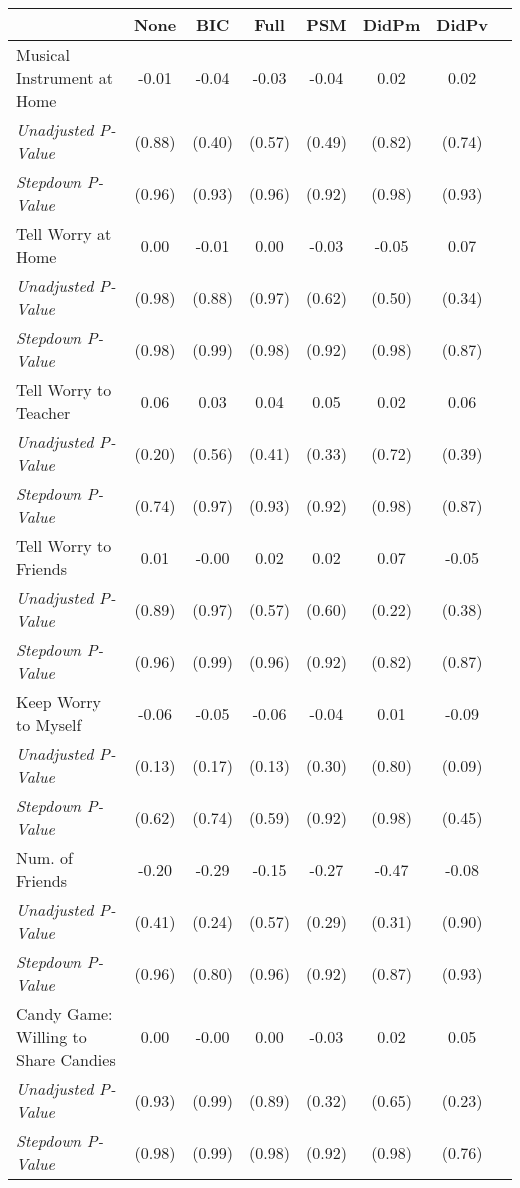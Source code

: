 \begin{tabular}{l c c c c c c c}
\toprule
 & None & BIC & Full & PSM & DidPm & DidPv \\
\midrule
Musical Instrument at Home & -0.01 & -0.04 & -0.03 & -0.04 & 0.02 & 0.02 \\
\quad \textit{Unadjusted P-Value} & (0.88) & (0.40) & (0.57) & (0.49) & (0.82) & (0.74) \\
\quad \textit{Stepdown P-Value} & (0.96) & (0.93) & (0.96) & (0.92) & (0.98) & (0.93) \\
Tell Worry at Home & 0.00 & -0.01 & 0.00 & -0.03 & -0.05 & 0.07 \\
\quad \textit{Unadjusted P-Value} & (0.98) & (0.88) & (0.97) & (0.62) & (0.50) & (0.34) \\
\quad \textit{Stepdown P-Value} & (0.98) & (0.99) & (0.98) & (0.92) & (0.98) & (0.87) \\
Tell Worry to Teacher & 0.06 & 0.03 & 0.04 & 0.05 & 0.02 & 0.06 \\
\quad \textit{Unadjusted P-Value} & (0.20) & (0.56) & (0.41) & (0.33) & (0.72) & (0.39) \\
\quad \textit{Stepdown P-Value} & (0.74) & (0.97) & (0.93) & (0.92) & (0.98) & (0.87) \\
Tell Worry to Friends & 0.01 & -0.00 & 0.02 & 0.02 & 0.07 & -0.05 \\
\quad \textit{Unadjusted P-Value} & (0.89) & (0.97) & (0.57) & (0.60) & (0.22) & (0.38) \\
\quad \textit{Stepdown P-Value} & (0.96) & (0.99) & (0.96) & (0.92) & (0.82) & (0.87) \\
Keep Worry to Myself & -0.06 & -0.05 & -0.06 & -0.04 & 0.01 & -0.09 \\
\quad \textit{Unadjusted P-Value} & (0.13) & (0.17) & (0.13) & (0.30) & (0.80) & (0.09) \\
\quad \textit{Stepdown P-Value} & (0.62) & (0.74) & (0.59) & (0.92) & (0.98) & (0.45) \\
Num. of Friends & -0.20 & -0.29 & -0.15 & -0.27 & -0.47 & -0.08 \\
\quad \textit{Unadjusted P-Value} & (0.41) & (0.24) & (0.57) & (0.29) & (0.31) & (0.90) \\
\quad \textit{Stepdown P-Value} & (0.96) & (0.80) & (0.96) & (0.92) & (0.87) & (0.93) \\
Candy Game: Willing to Share Candies & 0.00 & -0.00 & 0.00 & -0.03 & 0.02 & 0.05 \\
\quad \textit{Unadjusted P-Value} & (0.93) & (0.99) & (0.89) & (0.32) & (0.65) & (0.23) \\
\quad \textit{Stepdown P-Value} & (0.98) & (0.99) & (0.98) & (0.92) & (0.98) & (0.76) \\
\bottomrule
\end{tabular}
